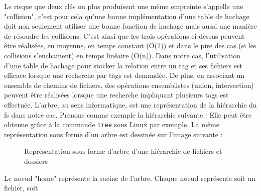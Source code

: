 \documentclass[a4paper, 12pt]{article}
\begin{document}
Le risque que deux clés ou plus produisent une même empreinte s'appelle une "collision", c'est 
pour cela qu'une bonne implémentation d'une table de hachage doit non seulement utiliser une bonne 
fonction de hachage mais aussi une manière de résoudre les collisions. C'est ainsi que les trois 
opérations ci-dessus peuvent être réalisées, en moyenne, en temps constant (O(1)) et dans le pire 
des cas (si les collisions s'enchainent) en temps linéaire (O(n)). Dans notre cas, l'utilisation 
d'une table de hachage pour stocker la relation entre un tag et ses fichiers est efficace lorsque 
une recherche par tags est demandée. De plus, en associant un ensemble de chemins de fichiers, 
des opérations ensemblistes (union, intersection) peuvent être réalisées lorsque une recherche 
impliquant plusieurs tags est effectuée.
\bigbreak
L'arbre, au sens informatique, est une représentation de la hiérarchie du \acrshort{fs} dans 
notre cas. Prenons comme exemple la hiérarchie suivante :
Elle peut être obtenue grâce à la commande \texttt{tree} sous Linux par exemple.
La même représentation sous forme d'un arbre est dessinée sur l'image suivante :
\begin{figure}
    \begin{center}
    \end{center}
    \caption{Représentation sous forme d'arbre d'une hiérarchie de fichiers et dossiers}
\end{figure}
Le noeud "home" représente la racine de l'arbre. Chaque noeud représente soit un fichier, soit 
\end{document}
